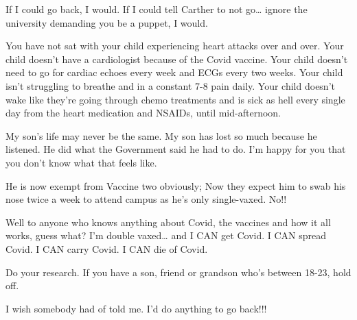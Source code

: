 If I could go back, I would. If I could tell Carther to not go… ignore the
university demanding you be a puppet, I would.

You have not sat with your child experiencing heart attacks over and over. Your
child doesn’t have a cardiologist because of the Covid vaccine. Your child
doesn’t need to go for cardiac echoes every week and ECGs every two weeks. Your
child isn’t struggling to breathe and in a constant 7-8 pain daily. Your child
doesn’t wake like they’re going through chemo treatments and is sick as hell
every single day from the heart medication and NSAIDs, until mid-afternoon.

My son’s life may never be the same. My son has lost so much because he
listened. He did what the Government said he had to do. I’m happy for you that
you don’t know what that feels like.

He is now exempt from Vaccine two obviously; Now they expect him to swab his
nose twice a week to attend campus as he’s only single-vaxed. No!!

Well to anyone who knows anything about Covid, the vaccines and how it all
works, guess what? I’m double vaxed… and I CAN get Covid. I CAN spread Covid. I
CAN carry Covid. I CAN die of Covid.

Do your research. If you have a son, friend or grandson who’s between 18-23,
hold off.

I wish somebody had of told me. I’d do anything to go back!!!
